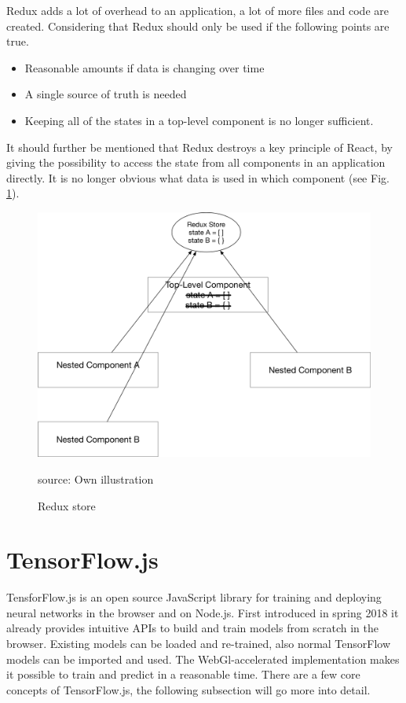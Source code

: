 Redux adds a lot of overhead to an application, a lot of more files and code are created. Considering that Redux should only be used if the following points are true. 

\begin{itemize}
\item Reasonable amounts if data is changing over time
\item A single source of truth is needed
\item Keeping all of the states in a top-level component is no longer sufficient.
\end{itemize}

It should further be mentioned that Redux destroys a key principle of React, by giving the possibility to access the state from all components in an application directly. It is no longer obvious what data is used in which component (see Fig. \ref{fig:Redux}).
\begin{figure}[H]
	\centering
	\includegraphics[width=0.8\linewidth]{bilder/grundlagen/reduxStore.png}
	\caption{Redux store} source: Own illustration
	\label{fig:Redux}
\end{figure}

\section{TensorFlow.js}
TensforFlow.js is an open source JavaScript library for training and deploying neural networks in the browser and on Node.js. First introduced in spring 2018 it already provides intuitive APIs to build and train models from scratch in the browser. Existing models can be loaded and re-trained, also normal TensorFlow models can be imported and used. The WebGl-accelerated implementation makes it possible to train and predict in a reasonable time. There are a few core concepts of TensorFlow.js, the following subsection will go more into detail. \cite{TenosrFLowJs}

